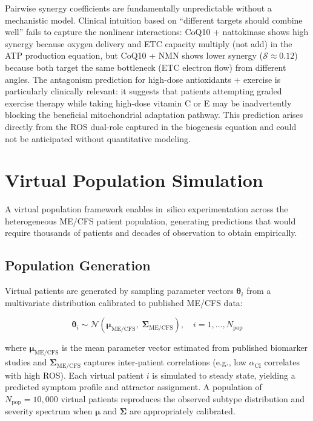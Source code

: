 \begin{modelunique}
Pairwise synergy coefficients are fundamentally unpredictable without a mechanistic model. Clinical intuition based on ``different targets should combine well'' fails to capture the nonlinear interactions: CoQ10 + nattokinase shows high synergy because oxygen delivery and ETC capacity multiply (not add) in the ATP production equation, but CoQ10 + NMN shows lower synergy ($\mathcal{S} \approx 0.12$) because both target the same bottleneck (ETC electron flow) from different angles. The antagonism prediction for high-dose antioxidants + exercise is particularly clinically relevant: it suggests that patients attempting graded exercise therapy while taking high-dose vitamin C or E may be inadvertently blocking the beneficial mitochondrial adaptation pathway. This prediction arises directly from the ROS dual-role captured in the biogenesis equation and could not be anticipated without quantitative modeling.
\end{modelunique}

\section{Virtual Population Simulation}
\label{sec:virtual-population}

A virtual population framework enables in~silico experimentation across the heterogeneous ME/CFS patient population, generating predictions that would require thousands of patients and decades of observation to obtain empirically.

\subsection{Population Generation}

Virtual patients are generated by sampling parameter vectors $\boldsymbol{\theta}_i$ from a multivariate distribution calibrated to published ME/CFS data:

\begin{equation}
\label{eq:virtual-population}
\boldsymbol{\theta}_i \sim \mathcal{N}(\boldsymbol{\mu}_{\text{ME/CFS}},\; \boldsymbol{\Sigma}_{\text{ME/CFS}}), \quad i = 1, \ldots, N_{\text{pop}}
\end{equation}

where $\boldsymbol{\mu}_{\text{ME/CFS}}$ is the mean parameter vector estimated from published biomarker studies and $\boldsymbol{\Sigma}_{\text{ME/CFS}}$ captures inter-patient correlations (e.g., low $\alpha_{\text{CI}}$ correlates with high ROS). Each virtual patient $i$ is simulated to steady state, yielding a predicted symptom profile and attractor assignment. A population of $N_{\text{pop}} = 10{,}000$ virtual patients reproduces the observed subtype distribution and severity spectrum when $\boldsymbol{\mu}$ and $\boldsymbol{\Sigma}$ are appropriately calibrated.

